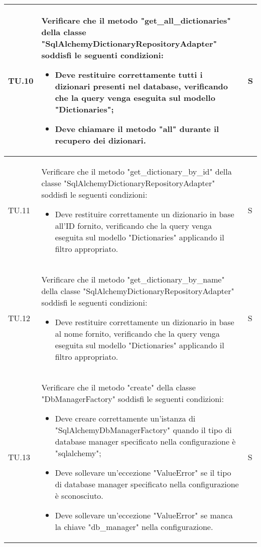 \begin{adjustwidth}{-0.5cm}{-0.5cm}
\begin{longtable}{|P{1.5cm}|>{\raggedright}P{9.5cm}|>{\arraybackslash}P{1.5cm}|}
		\hline TU.10 & Verificare che il metodo "get\_all\_dictionaries" della classe "SqlAlchemyDictionaryRepositoryAdapter" soddisfi le seguenti condizioni:
		\begin{itemize}
			\item Deve restituire correttamente tutti i dizionari presenti nel database, verificando che la query venga eseguita sul modello "Dictionaries";
			\item Deve chiamare il metodo "all" durante il recupero dei dizionari.
		\end{itemize} & S \\

		\hline TU.11 & Verificare che il metodo "get\_dictionary\_by\_id" della classe "SqlAlchemyDictionaryRepositoryAdapter" soddisfi le seguenti condizioni:
		\begin{itemize}
			\item Deve restituire correttamente un dizionario in base all'ID fornito, verificando che la query venga eseguita sul modello "Dictionaries" applicando il filtro appropriato.
		\end{itemize} & S \\

		\hline TU.12 & Verificare che il metodo "get\_dictionary\_by\_name" della classe "SqlAlchemyDictionaryRepositoryAdapter" soddisfi le seguenti condizioni:
		\begin{itemize}
			\item Deve restituire correttamente un dizionario in base al nome fornito, verificando che la query venga eseguita sul modello "Dictionaries" applicando il filtro appropriato.
		\end{itemize} & S \\

		\hline TU.13 & Verificare che il metodo "create" della classe "DbManagerFactory" soddisfi le seguenti condizioni:
		\begin{itemize}
			\item Deve creare correttamente un'istanza di "SqlAlchemyDbManagerFactory" quando il tipo di database manager specificato nella configurazione è "sqlalchemy";
			\item Deve sollevare un'eccezione "ValueError" se il tipo di database manager specificato nella configurazione è sconosciuto.
			\item Deve sollevare un'eccezione "ValueError" se manca la chiave "db\_manager" nella configurazione.
		\end{itemize} & S \\


\end{longtable}
\end{adjustwidth}
